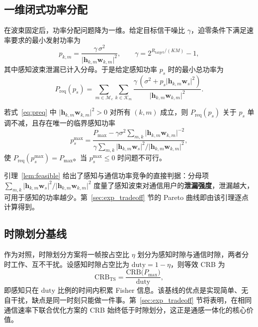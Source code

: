 \subsection{一维闭式功率分配}
\label{sec:power}

在波束固定后，功率分配问题降为一维。给定目标信干噪比 $\gamma$，迫零条件下满足速率要求的最小发射功率为
\begin{equation}
  p_{k,m}=\frac{\gamma\,\sigma^{2}}{\lvert\mathbf{h}_{k,m}\mathbf{w}_{k,m}\rvert^{2}},
  \qquad
  \gamma=2^{R_{\mathrm{target}}/(KM)}-1,
  \label{eq:min_power}
\end{equation}
其中感知波束泄漏已计入分母。于是给定感知功率 $p_{s}$ 时的最小总功率为
\begin{equation}
  P_{\mathrm{req}}(p_{s})=\sum_{m\in\mathcal{M}_{c}}\sum_{k\in\mathcal{K}_m}\frac{\gamma\,(\sigma^{2}+p_{s}\lvert\mathbf{h}_{k,m}\mathbf{w}_{s}\rvert^{2})}{\lvert\mathbf{h}_{k,m}\mathbf{w}_{k,m}\rvert^{2}}.
  \label{eq:preq}
\end{equation}

\begin{lemma}[可行感知功率区间]
\label{lem:feasible}
若式~\eqref{eq:preq} 中 $\lvert\mathbf{h}_{k,m}\mathbf{w}_{k,m}\rvert^{2}>0$ 对所有 $(k,m)$ 成立，则 $P_{\mathrm{req}}(p_{s})$ 关于 $p_{s}$ 单调不减，且存在唯一的临界感知功率
\begin{equation}
  p_{s}^{\max}=\frac{P_{\max}-\gamma\sigma^{2}\sum_{m,k}\lvert\mathbf{h}_{k,m}\mathbf{w}_{k,m}\rvert^{-2}}
  {\gamma\sum_{m,k}\lvert\mathbf{h}_{k,m}\mathbf{w}_{s}\rvert^{2}/\lvert\mathbf{h}_{k,m}\mathbf{w}_{k,m}\rvert^{2}},
  \label{eq:ps_max}
\end{equation}
使 $P_{\mathrm{req}}(p_{s}^{\max})=P_{\max}$。当 $p_{s}^{\max}\le0$ 时问题不可行。
\end{lemma}

引理~\ref{lem:feasible} 给出了感知与通信功率竞争的直接判据：分母项 $\sum_{m,k}\lvert\mathbf{h}_{k,m}\mathbf{w}_{s}\rvert^{2}/\lvert\mathbf{h}_{k,m}\mathbf{w}_{k,m}\rvert^{2}$ 度量了感知波束对通信用户的\textbf{泄漏强度}，泄漏越大，可用于感知的功率越少。第~\ref{sec:exp_tradeoff} 节的 Pareto 曲线即由该引理逐点计算得到。

\subsection{时隙划分基线}
\label{sec:timesharing}

作为对照，时隙划分方案将一帧按占空比 $\eta$ 划分为感知时隙与通信时隙，两者分时工作、互不干扰。设感知时隙占空比为 $\mathrm{duty}=1-\eta$，则等效 CRB 为
\begin{equation}
  \mathrm{CRB}_{\mathrm{TS}}=\frac{\mathrm{CRB}\bigl(P_{\max}\bigr)}{\mathrm{duty}},
  \label{eq:ts}
\end{equation}
即感知只在 $\mathrm{duty}$ 比例的时间内积累 Fisher 信息。该基线的优点是实现简单、无自干扰，缺点是同一时刻只能做一件事。第~\ref{sec:exp_tradeoff} 节将表明，在相同通信速率下联合优化方案的 CRB 始终低于时隙划分，这正是通感一体化的核心价值。

